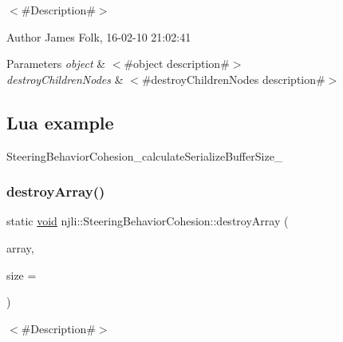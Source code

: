 $<$\#\+Description\#$>$ 

\begin{DoxyAuthor}{Author}
James Folk, 16-\/02-\/10 21\+:02\+:41
\end{DoxyAuthor}

\begin{DoxyParams}{Parameters}
{\em object} & $<$\#object description\#$>$ \\
\hline
{\em destroy\+Children\+Nodes} & $<$\#destroy\+Children\+Nodes description\#$>$\\
\hline
\end{DoxyParams}
\hypertarget{classnjli_1_1_steering_behavior_wander_ex1}{}\subsection{Lua example}\label{classnjli_1_1_steering_behavior_wander_ex1}

\begin{DoxyCodeInclude}
\end{DoxyCodeInclude}
Steering\+Behavior\+Cohesion\+\_\+calculate\+Serialize\+Buffer\+Size\+\_\+ \mbox{\label{classnjli_1_1_steering_behavior_cohesion_a0a5ef08843ce560e0b9af63b2fc8bcc5}} 
\subsubsection{\texorpdfstring{destroy\+Array()}{destroyArray()}}
{\footnotesize\ttfamily static \mbox{\hyperlink{_thread_8h_af1e856da2e658414cb2456cb6f7ebc66}{void}} njli\+::\+Steering\+Behavior\+Cohesion\+::destroy\+Array (\begin{DoxyParamCaption}\item[{\mbox{\hyperlink{classnjli_1_1_steering_behavior_cohesion}{Steering\+Behavior\+Cohesion}} $\ast$$\ast$}]{array,  }\item[{const \mbox{\hyperlink{_util_8h_a10e94b422ef0c20dcdec20d31a1f5049}{u32}}}]{size = {} }\end{DoxyParamCaption})\hspace{0.3cm}{\ttfamily [static]}}



$<$\#\+Description\#$>$ 

